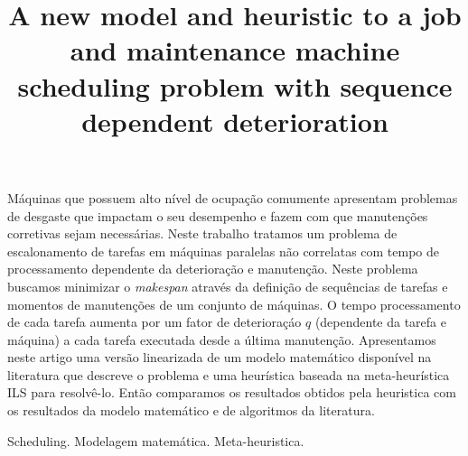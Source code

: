 \documentclass[a4paper,11pt]{article}
\begin{document}
\title{A new model and heuristic to a job and maintenance machine scheduling problem with sequence dependent deterioration } 

\maketitle
\thispagestyle{fancy}

\author{
}

\author{ 
}

\vspace{8mm}
\begin{resumo}
M\'aquinas que possuem alto n\'ivel de ocupa\c c\~ao comumente apresentam problemas de desgaste que impactam o seu desempenho e fazem com que manuten\c c\~oes corretivas sejam necess\'arias. Neste trabalho tratamos um problema de escalonamento de tarefas em m\'aquinas paralelas n\~ao correlatas com tempo de processamento dependente da deteriora\c c\~ao e manuten\c c\~ao. Neste problema buscamos minimizar o \emph{makespan} atrav\'es da defini\c c\~ao de sequ\^encias de tarefas e momentos de manuten\c c\~oes de um conjunto de m\'aquinas. O tempo processamento de cada tarefa aumenta por um fator de deteriora\c c\'ao $q$ (dependente da tarefa e m\'aquina) a cada tarefa executada desde a \'ultima manuten\c c\~ao. Apresentamos neste artigo uma vers\~ao linearizada de um modelo matem\'atico dispon\'ivel na literatura que descreve o problema e uma heur\'istica baseada na meta-heur\'istica ILS para resolv\^e-lo. Ent\~ao comparamos os resultados obtidos pela heuristica com os resultados da modelo matem\'atico e de algoritmos da literatura. 
 \end{resumo}

\bigskip
\begin{palchaves}
Scheduling. Modelagem matem\'atica. Meta-heuristica.

\bigskip
{}
\end{palchaves}


\vspace{8mm}
\end{document}
